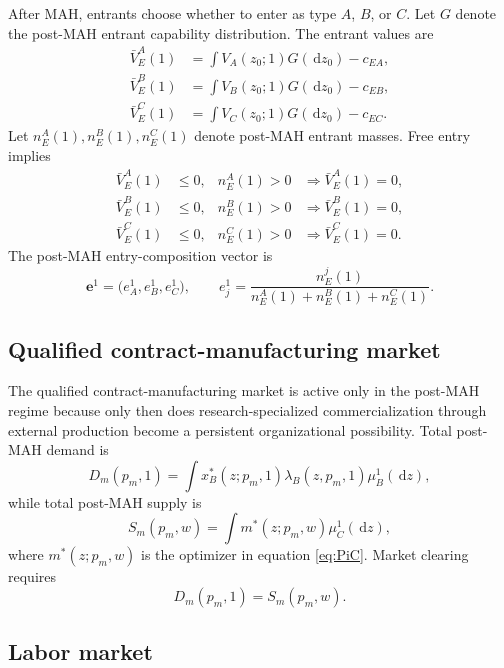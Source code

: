 \documentclass[12pt]{article}
\newcommand{\1}{\mathbf{1}}
\newcommand{\dd}{\,\mathrm{d}}
\begin{document}
After MAH, entrants choose whether to enter as type $A$, $B$, or $C$. Let $G$ denote the post-MAH entrant capability distribution. The entrant values are
\begin{align}
\bar V_E^A(1)&=\int V_A(z_0;1)G(\dd z_0)-c_{EA},\\
\bar V_E^B(1)&=\int V_B(z_0;1)G(\dd z_0)-c_{EB},\\
\bar V_E^C(1)&=\int V_C(z_0;1)G(\dd z_0)-c_{EC}.
\end{align}
Let $n_E^A(1),n_E^B(1),n_E^C(1)$ denote post-MAH entrant masses. Free entry implies
\begin{align}
\bar V_E^A(1) &\le 0, & n_E^A(1)>0 &\Rightarrow \bar V_E^A(1)=0, \\
\bar V_E^B(1) &\le 0, & n_E^B(1)>0 &\Rightarrow \bar V_E^B(1)=0, \\
\bar V_E^C(1) &\le 0, & n_E^C(1)>0 &\Rightarrow \bar V_E^C(1)=0.
\end{align}
The post-MAH entry-composition vector is
\begin{equation}
\mathbf e^1=\bigl(e_A^1,e_B^1,e_C^1\bigr),
\qquad
 e_j^1=\frac{n_E^j(1)}{n_E^A(1)+n_E^B(1)+n_E^C(1)}.
\label{eq:entry_vector_post}
\end{equation}

\subsection{Qualified contract-manufacturing market}

The qualified contract-manufacturing market is active only in the post-MAH regime because only then does research-specialized commercialization through external production become a persistent organizational possibility. Total post-MAH demand is
\begin{equation}
D_m(p_m,1)=\int x_B^*(z;p_m,1)\lambda_B(z,p_m,1)\mu_B^1(\dd z),
\label{eq:Dm}
\end{equation}
while total post-MAH supply is
\begin{equation}
S_m(p_m,w)=\int m^*(z;p_m,w)\mu_C^1(\dd z),
\label{eq:Sm}
\end{equation}
where $m^*(z;p_m,w)$ is the optimizer in equation \eqref{eq:PiC}. Market clearing requires
\begin{equation}
D_m(p_m,1)=S_m(p_m,w).
\label{eq:pm_clear}
\end{equation}

\subsection{Labor market}
\end{document}
